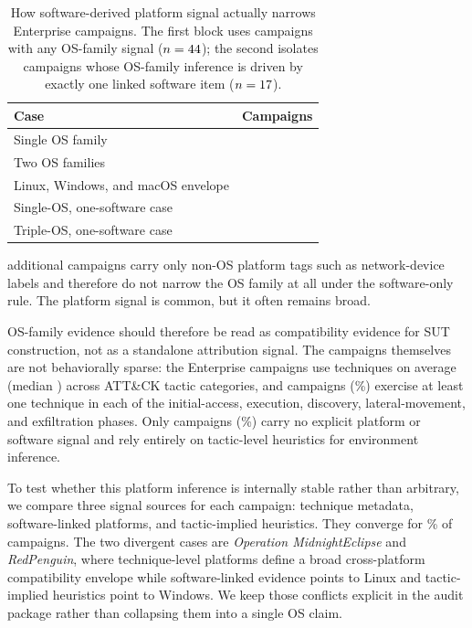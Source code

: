 \documentclass[sigconf]{acmart}
\begin{document}
\begin{table}[!tb]
\caption{How software-derived platform signal actually narrows Enterprise campaigns. The first block uses campaigns with any OS-family signal ($n=44{}$); the second isolates campaigns whose OS-family inference is driven by exactly one linked software item ($n=17{}$).}\label{tab:platform_narrowing_quality}
\centering\footnotesize
\begin{tabular}{@{}lr@{}}
\toprule
\textbf{Case} & \textbf{Campaigns} \\
\midrule
Single OS family & \campaignswithsingleosfamilycount{} \\
Two OS families & \campaignswithdualosfamilycount{} \\
Linux, Windows, and macOS envelope & \campaignswithtripleosfamilycount{} \\
\midrule
Single-OS, one-software case & \onesoftwarecampaignssingleoscount{} \\
Triple-OS, one-software case & \onesoftwarecampaignstripleoscount{} \\
\bottomrule
\end{tabular}
\end{table}

\campaignswithnonosonlyplatformsignalcount{} additional campaigns carry only non-OS platform tags such as network-device labels and therefore do not narrow the OS family at all under the software-only rule. The platform signal is common, but it often remains broad.

OS-family evidence should therefore be read as compatibility evidence for SUT construction, not as a standalone attribution signal. The campaigns themselves are not behaviorally sparse: the \enterpriseactivecampaigncount{} Enterprise campaigns use \campaignmeantechniquecount{} techniques on average (median \campaignmediantechniquecount{}) across \campaignmeantacticcoverage{} ATT\&CK tactic categories, and \campaigncompletekillchaincount{} campaigns (\campaigncompletekillchainpct\%) exercise at least one technique in each of the initial-access, execution, discovery, lateral-movement, and exfiltration phases. Only \ieircount{} campaigns (\ieirpct\%) carry no explicit platform or software signal and rely entirely on tactic-level heuristics for environment inference.

To test whether this platform inference is internally stable rather than arbitrary, we compare three signal sources for each campaign: technique metadata, software-linked platforms, and tactic-implied heuristics. They converge for \evidenceconvergenceratepct\% of campaigns. The two divergent cases are \emph{Operation MidnightEclipse} and \emph{RedPenguin}, where technique-level platforms define a broad cross-platform compatibility envelope while software-linked evidence points to Linux and tactic-implied heuristics point to Windows. We keep those conflicts explicit in the audit package rather than collapsing them into a single OS claim.
\end{document}
